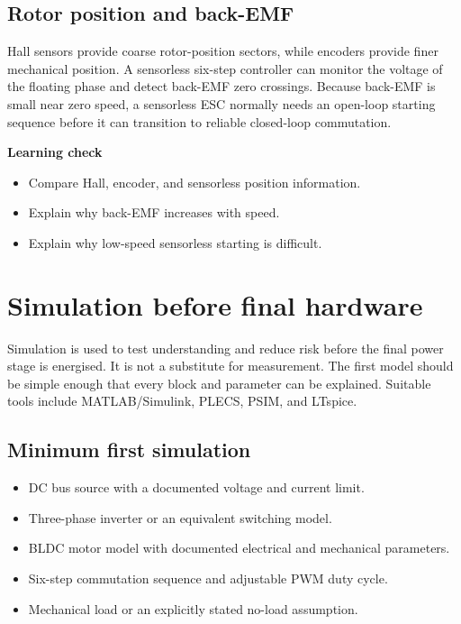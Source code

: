 \documentclass[11pt,a4paper]{article}
\begin{document}
\subsection{Rotor position and back-EMF}

Hall sensors provide coarse rotor-position sectors, while encoders provide
finer mechanical position. A sensorless six-step controller can monitor the
voltage of the floating phase and detect back-EMF zero crossings. Because
back-EMF is small near zero speed, a sensorless ESC normally needs an
open-loop starting sequence before it can transition to reliable
closed-loop commutation.

\textbf{Learning check}
\begin{itemize}
  \item Compare Hall, encoder, and sensorless position information.
  \item Explain why back-EMF increases with speed.
  \item Explain why low-speed sensorless starting is difficult.
\end{itemize}

\section{Simulation before final hardware}

Simulation is used to test understanding and reduce risk before the final
power stage is energised. It is not a substitute for measurement. The first
model should be simple enough that every block and parameter can be
explained. Suitable tools include MATLAB/Simulink, PLECS, PSIM, and LTspice.

\subsection{Minimum first simulation}

\begin{itemize}
  \item DC bus source with a documented voltage and current limit.
  \item Three-phase inverter or an equivalent switching model.
  \item BLDC motor model with documented electrical and mechanical parameters.
  \item Six-step commutation sequence and adjustable PWM duty cycle.
  \item Mechanical load or an explicitly stated no-load assumption.
\end{itemize}
\end{document}
